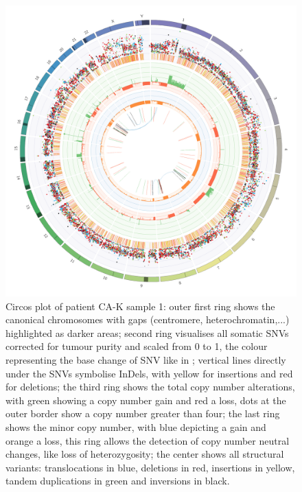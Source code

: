 \begin{figure}[htp]
\centering
\includegraphics[width=.99\linewidth]{Figures/CASCADE/CA82/CA82-1.circos.png}
\caption[Circos plot of patient CA-K sample 1]{Circos plot of patient CA-K sample 1: outer first ring shows the canonical chromosomes with gaps (centromere, heterochromatin,...) highlighted as darker areas; second ring visualises all somatic SNVs corrected for tumour purity and scaled from 0 to 1, the colour representing the base change of SNV like in \protect\textcite{Alexandrov2013}; vertical lines directly under the SNVs symbolise InDels, with yellow for insertions and red for deletions; the third ring shows the total copy number alterations, with green showing a copy number gain and red a loss, dots at the outer border show a copy number greater than four; the last ring shows the minor copy number, with blue depicting a gain and orange a loss, this ring allows the detection of copy number neutral changes, like loss of heterozygosity; the center shows all structural variants: translocations in blue, deletions in red, insertions in yellow, tandem duplications in green and inversions in black.} \label{fig:ca82.1circos}
\end{figure}



